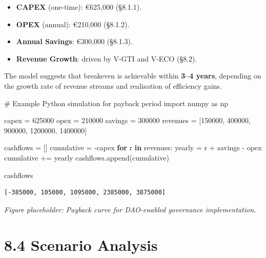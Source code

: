 \documentclass[
  english,
  12pt,
  oneside,
  open=any]{scrbook}
\newenvironment{Shaded}{\begin{snugshade}}{\end{snugshade}}
\newcommand{\CommentTok}[1]{\textcolor[rgb]{0.37,0.37,0.37}{#1}}
\newcommand{\ControlFlowTok}[1]{\textcolor[rgb]{0.00,0.23,0.31}{\textbf{#1}}}
\newcommand{\DecValTok}[1]{\textcolor[rgb]{0.68,0.00,0.00}{#1}}
\newcommand{\ImportTok}[1]{\textcolor[rgb]{0.00,0.46,0.62}{#1}}
\newcommand{\KeywordTok}[1]{\textcolor[rgb]{0.00,0.23,0.31}{\textbf{#1}}}
\newcommand{\NormalTok}[1]{\textcolor[rgb]{0.00,0.23,0.31}{#1}}
\newcommand{\OperatorTok}[1]{\textcolor[rgb]{0.37,0.37,0.37}{#1}}
\providecommand{\tightlist}{%
  \setlength{\itemsep}{0pt}\setlength{\parskip}{0pt}}\usepackage{longtable,booktabs,array}
\begin{document}
\begin{itemize}
\tightlist
\item
  \textbf{CAPEX} (one-time): €625,000 (§8.1.1).\\
\item
  \textbf{OPEX} (annual): €210,000 (§8.1.2).\\
\item
  \textbf{Annual Savings}: €300,000 (§8.1.3).\\
\item
  \textbf{Revenue Growth}: driven by V-GTI and V-ECO (§8.2).
\end{itemize}

The model suggests that breakeven is achievable within \textbf{3--4
years}, depending on the growth rate of revenue streams and realisation
of efficiency gains.

\begin{Shaded}
\begin{Highlighting}[]
\CommentTok{\# Example Python simulation for payback period}
\ImportTok{import}\NormalTok{ numpy }\ImportTok{as}\NormalTok{ np}

\NormalTok{capex }\OperatorTok{=} \DecValTok{625000}
\NormalTok{opex }\OperatorTok{=} \DecValTok{210000}
\NormalTok{savings }\OperatorTok{=} \DecValTok{300000}
\NormalTok{revenues }\OperatorTok{=}\NormalTok{ [}\DecValTok{150000}\NormalTok{, }\DecValTok{400000}\NormalTok{, }\DecValTok{900000}\NormalTok{, }\DecValTok{1200000}\NormalTok{, }\DecValTok{1400000}\NormalTok{]}

\NormalTok{cashflows }\OperatorTok{=}\NormalTok{ []}
\NormalTok{cumulative }\OperatorTok{=} \OperatorTok{{-}}\NormalTok{capex}
\ControlFlowTok{for}\NormalTok{ r }\KeywordTok{in}\NormalTok{ revenues:}
\NormalTok{    yearly }\OperatorTok{=}\NormalTok{ r }\OperatorTok{+}\NormalTok{ savings }\OperatorTok{{-}}\NormalTok{ opex}
\NormalTok{    cumulative }\OperatorTok{+=}\NormalTok{ yearly}
\NormalTok{    cashflows.append(cumulative)}

\NormalTok{cashflows}
\end{Highlighting}
\end{Shaded}

\begin{verbatim}
[-385000, 105000, 1095000, 2385000, 3875000]
\end{verbatim}

\emph{Figure placeholder: Payback curve for DAO-enabled governance
implementation.}

\section{8.4 Scenario Analysis}\label{sec-scenarios}
\end{document}
